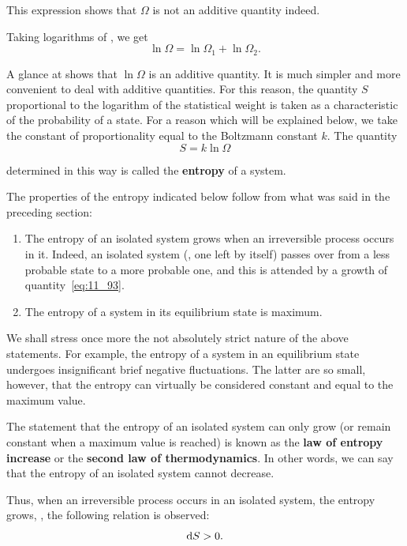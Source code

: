 \noindent
This expression shows that $\Omega$ is not an additive quantity indeed.

Taking logarithms of , we get
\begin{equation}\label{eq:11_92}
	\ln{\Omega} = \ln{\Omega_1} + \ln{\Omega_2}.
\end{equation}

\noindent
A glance at  shows that $\ln{\Omega}$ is an additive quantity. It is much simpler and more convenient to deal with additive quantities. For this reason, the quantity $S$ proportional to the logarithm of the statistical weight is taken as a characteristic of the probability of a state. For a reason which will be explained below, we take the constant of proportionality equal to the Boltzmann constant $k$. The quantity
\begin{equation}\label{eq:11_93}
	S = k \ln{\Omega}
\end{equation}

\noindent
determined in this way is called the \textbf{entropy} of a system.

The properties of the entropy indicated below follow from what was said in the preceding section:
\begin{enumerate}[1.]
	\item The entropy of an isolated system grows when an irreversible process occurs in it. Indeed, an isolated system (\ie, one left by itself) passes over from a less probable state to a more probable one, and this is attended by a growth of quantity~\eqref{eq:11_93}.
	\item The entropy of a system in its equilibrium state is maximum.
\end{enumerate}

We shall stress once more the not absolutely strict nature of the above statements. For example, the entropy of a system in an equilibrium state undergoes insignificant brief negative fluctuations. The latter are so small, however, that the entropy can virtually be considered constant and equal to the maximum value.

The statement that the entropy of an isolated system can only grow (or remain constant when a maximum value is reached) is known as the \textbf{law of entropy increase} or the \textbf{second law of thermodynamics}. In other words, we can say that the entropy of an isolated system cannot decrease.

Thus, when an irreversible process occurs in an isolated system, the entropy grows, \ie, the following relation is observed:
\begin{equation}\label{eq:11_94}
	\mathrm{d} S > 0.
\end{equation}

